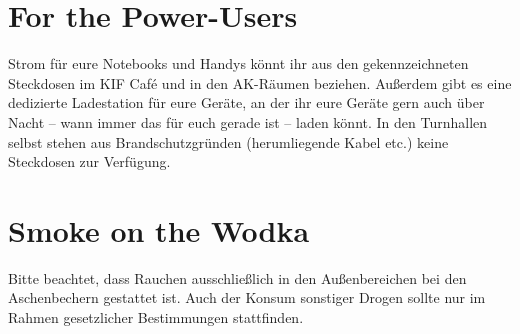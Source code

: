 \section*{For the Power-Users}

Strom für eure Notebooks und Handys könnt ihr aus den gekennzeichneten Steckdosen im KIF Café und in den AK-Räumen beziehen.
Außerdem gibt es eine dedizierte Ladestation für eure Geräte, an der ihr eure Geräte gern auch über Nacht -- wann immer das für euch gerade ist -- laden könnt.
In den Turnhallen selbst stehen aus Brandschutzgründen (herumliegende Kabel etc.) keine Steckdosen zur Verfügung.

\section*{Smoke on the Wodka}

Bitte beachtet, dass Rauchen ausschließlich in den Außenbereichen bei den Aschenbechern gestattet ist.
Auch der Konsum sonstiger Drogen sollte nur im Rahmen gesetzlicher Bestimmungen stattfinden.
